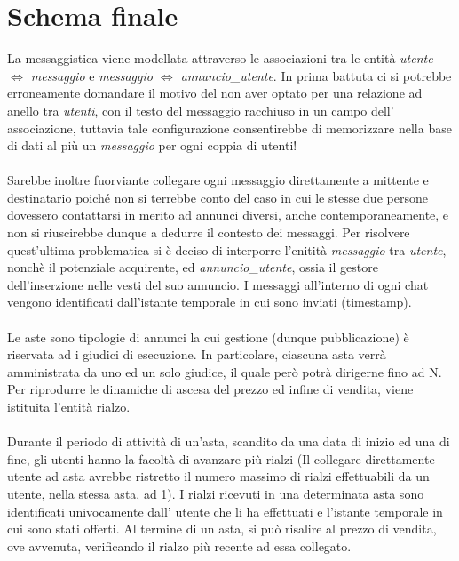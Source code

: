 \documentclass[a4paper,12pt]{report}
\begin{document}
    	\section{Schema finale}
        La messaggistica viene modellata attraverso le associazioni tra le entità \textit{utente $\Leftrightarrow$ messaggio} e 
        \textit{messaggio $\Leftrightarrow$ annuncio\_utente}. In prima battuta ci si potrebbe erroneamente domandare il motivo 
        del non aver optato per una relazione ad anello tra \textit{utenti}, con il testo del messaggio racchiuso in un campo 
        dell’ associazione, tuttavia tale configurazione consentirebbe di memorizzare nella base di dati al più un 
        \textit{messaggio} per ogni coppia di utenti! \\
        \\
        Sarebbe inoltre fuorviante collegare ogni messaggio direttamente 
        a mittente e destinatario poiché non si terrebbe conto del caso in cui le stesse due persone dovessero contattarsi in merito ad annunci 
        diversi, anche contemporaneamente, e non si riuscirebbe dunque a dedurre il contesto dei messaggi. Per risolvere quest’ultima problematica 
        si è deciso di interporre l'enitità \textit{messaggio} tra \textit{utente}, nonchè il potenziale acquirente, ed \textit{annuncio\_utente}, 
        ossia il gestore dell’inserzione nelle vesti del suo annuncio. I messaggi all’interno di ogni chat vengono identificati dall’istante 
        temporale in cui sono inviati (timestamp). \\
        
        \\
        Le aste sono tipologie di annunci la cui gestione (dunque pubblicazione) è riservata ad i giudici di esecuzione. In particolare, ciascuna 
        asta verrà amministrata da uno ed un solo giudice, il quale però potrà dirigerne fino ad N.
        Per riprodurre le dinamiche di ascesa del prezzo ed infine di vendita, viene istituita l’entità rialzo. \\
        \\
        Durante il periodo di attività di un’asta, scandito da una data di inizio ed una di fine, gli utenti hanno la facoltà di avanzare più rialzi 
        (Il collegare direttamente utente ad asta avrebbe ristretto il numero massimo di rialzi effettuabili da un utente, nella stessa asta, ad 1).
        I rialzi ricevuti in una determinata asta sono identificati univocamente dall’ utente che li ha effettuati e l’istante temporale in cui sono 
        stati offerti. Al termine di un asta, si può risalire al prezzo di vendita, ove avvenuta, verificando il rialzo più recente ad essa collegato.
\end{document}
